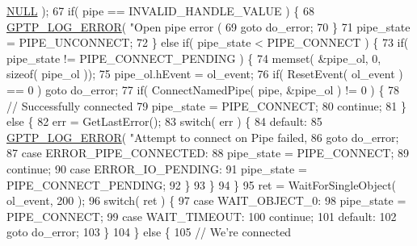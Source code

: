 \begin{DoxyCode}
      \hyperlink{openavb__types__base__pub_8h_a070d2ce7b6bb7e5c05602aa8c308d0c4}{NULL} );
67             \textcolor{keywordflow}{if}( pipe == INVALID\_HANDLE\_VALUE ) \{
68                 \hyperlink{gptp__log_8hpp_afefbb1009717c128012bfeed94842987}{GPTP\_LOG\_ERROR}( \textcolor{stringliteral}{"Open pipe error (%
69                 \textcolor{keywordflow}{goto} do\_error;
70             \}
71             pipe\_state = PIPE\_UNCONNECT;
72         \} \textcolor{keywordflow}{else} \textcolor{keywordflow}{if}( pipe\_state < PIPE\_CONNECT ) \{
73             \textcolor{keywordflow}{if}( pipe\_state != PIPE\_CONNECT\_PENDING ) \{
74                 memset( &pipe\_ol, 0, \textcolor{keyword}{sizeof}( pipe\_ol ));
75                 pipe\_ol.hEvent = ol\_event;
76                 \textcolor{keywordflow}{if}( ResetEvent( ol\_event ) == 0 ) \textcolor{keywordflow}{goto} do\_error;
77                 \textcolor{keywordflow}{if}( ConnectNamedPipe( pipe, &pipe\_ol ) != 0 ) \{
78                     \textcolor{comment}{// Successfully connected}
79                     pipe\_state = PIPE\_CONNECT;
80                     \textcolor{keywordflow}{continue};
81                 \} \textcolor{keywordflow}{else} \{
82                     err = GetLastError();
83                     \textcolor{keywordflow}{switch}( err ) \{
84                     \textcolor{keywordflow}{default}:
85                         \hyperlink{gptp__log_8hpp_afefbb1009717c128012bfeed94842987}{GPTP\_LOG\_ERROR}( \textcolor{stringliteral}{"Attempt to connect on Pipe failed, %
86                         \textcolor{keywordflow}{goto} do\_error;
87                     \textcolor{keywordflow}{case} ERROR\_PIPE\_CONNECTED:
88                         pipe\_state = PIPE\_CONNECT;
89                         \textcolor{keywordflow}{continue};
90                     \textcolor{keywordflow}{case} ERROR\_IO\_PENDING:
91                         pipe\_state = PIPE\_CONNECT\_PENDING;
92                     \}
93                 \}
94             \}
95             ret = WaitForSingleObject( ol\_event, 200 );
96             \textcolor{keywordflow}{switch}( ret ) \{
97             \textcolor{keywordflow}{case} WAIT\_OBJECT\_0:
98                 pipe\_state = PIPE\_CONNECT;
99             \textcolor{keywordflow}{case} WAIT\_TIMEOUT:
100                 \textcolor{keywordflow}{continue};
101             \textcolor{keywordflow}{default}:
102                 \textcolor{keywordflow}{goto} do\_error;
103             \}
104         \} \textcolor{keywordflow}{else} \{
105             \textcolor{comment}{// We're connected}
}}
\end{DoxyCode}
